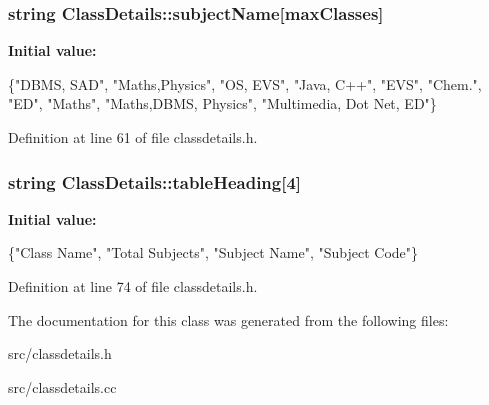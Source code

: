 \hypertarget{classClassDetails_a24cb6f1543b6a13e6308594903f0d7ab}{
\subsubsection[{subject\-Name}]{\setlength{\rightskip}{0pt plus 5cm}string Class\-Details\-::subject\-Name\mbox{[}max\-Classes\mbox{]}\hspace{0.3cm}{\ttfamily [protected]}}}\label{classClassDetails_a24cb6f1543b6a13e6308594903f0d7ab}
{\bfseries Initial value\-:}
\begin{DoxyCode}
 \{\textcolor{stringliteral}{"DBMS, SAD"}, \textcolor{stringliteral}{"Maths,Physics"},
                                          \textcolor{stringliteral}{"OS, EVS"}, \textcolor{stringliteral}{"Java, C++"}, \textcolor{stringliteral}{"EVS"},
                                          \textcolor{stringliteral}{"Chem."}, \textcolor{stringliteral}{"ED"}, \textcolor{stringliteral}{"Maths"},       
                                          \textcolor{stringliteral}{"Maths,DBMS, Physics"},
                                          \textcolor{stringliteral}{"Multimedia, Dot Net, ED"}\}
\end{DoxyCode}


Definition at line 61 of file classdetails.\-h.

\hypertarget{classClassDetails_a0f5d73651bbf0ea0919cb6a2993c2afc}{
\subsubsection[{table\-Heading}]{\setlength{\rightskip}{0pt plus 5cm}string Class\-Details\-::table\-Heading\mbox{[}4\mbox{]}\hspace{0.3cm}{\ttfamily [protected]}}}\label{classClassDetails_a0f5d73651bbf0ea0919cb6a2993c2afc}
{\bfseries Initial value\-:}
\begin{DoxyCode}
 \{\textcolor{stringliteral}{"Class Name"}, \textcolor{stringliteral}{"Total Subjects"}, 
                                  \textcolor{stringliteral}{"Subject Name"}, \textcolor{stringliteral}{"Subject Code"}\}
\end{DoxyCode}


Definition at line 74 of file classdetails.\-h.



The documentation for this class was generated from the following files\-:\begin{DoxyCompactItemize}
\item 
src/classdetails.\-h\item 
src/classdetails.\-cc\end{DoxyCompactItemize}
